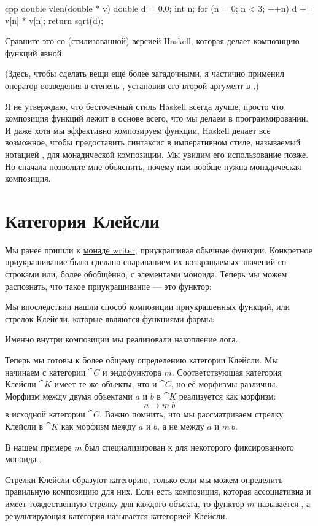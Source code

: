 \begin{snip}{cpp}
double vlen(double * v) {
    double d = 0.0;
    int n;
    for (n = 0; n < 3; ++n)
        d += v[n] * v[n];
    return sqrt(d);
}
\end{snip}
Сравните это со (стилизованной) версией Haskell, которая делает композицию функций
явной:

(Здесь, чтобы сделать вещи ещё более загадочными, я частично применил
оператор возведения в степень \code{(\^{})} , установив его второй аргумент
в .)

Я не утверждаю, что бесточечный стиль Haskell всегда лучше, просто
что композиция функций лежит в основе всего, что мы делаем в
программировании. И даже хотя мы эффективно композируем функции,
Haskell делает всё возможное, чтобы предоставить синтаксис в императивном стиле,
называемый нотацией , для монадической композиции. Мы увидим его
использование позже. Но сначала позвольте мне объяснить, почему нам вообще нужна монадическая композиция.

\section{Категория Клейсли}

Мы ранее пришли к
\hyperref[kleisli-categories]{монаде writer},
приукрашивая обычные функции. Конкретное приукрашивание
было сделано спариванием их возвращаемых значений со строками или, более обобщённо,
с элементами моноида. Теперь мы можем распознать, что такое приукрашивание ---
это функтор:

Мы впоследствии нашли способ композиции приукрашенных функций, или
стрелок Клейсли, которые являются функциями формы:

Именно внутри композиции мы реализовали накопление
лога.

Теперь мы готовы к более общему определению категории Клейсли.
Мы начинаем с категории $\cat{C}$ и эндофунктора $m$.
Соответствующая категория Клейсли $\cat{K}$ имеет те же объекты, что и
$\cat{C}$, но её морфизмы различны. Морфизм между двумя
объектами $a$ и $b$ в $\cat{K}$ реализуется как морфизм:
\[a \to m\ b\]
в исходной категории $\cat{C}$. Важно помнить, что
мы рассматриваем стрелку Клейсли в $\cat{K}$ как морфизм между $a$
и $b$, а не между $a$ и $m\ b$.

В нашем примере $m$ был специализирован к  для
некоторого фиксированного моноида .

Стрелки Клейсли образуют категорию, только если мы можем определить правильную композицию
для них. Если есть композиция, которая ассоциативна и имеет
тождественную стрелку для каждого объекта, то функтор $m$ называется
, а результирующая категория называется категорией Клейсли.

